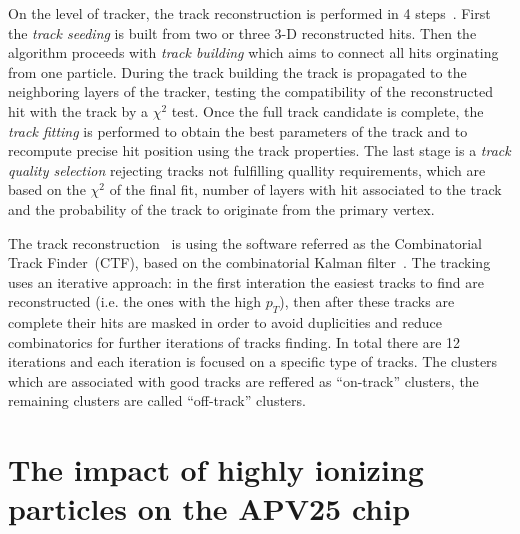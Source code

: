 
On the level of tracker, the track reconstruction is performed in 4 steps~\cite{website:slidesTracking, website:twikiTracking}. First the \textit{track seeding} is built from two or three 3-D reconstructed hits. Then the algorithm proceeds with \textit{track building} which aims to connect all hits orginating from one particle. During the track building the track is propagated to the neighboring layers of the tracker, testing the compatibility of the reconstructed hit with the track by a $\chi^{2}$ test. Once the full track candidate is complete, the \textit{track fitting} is performed to obtain the best parameters of the track and to recompute precise hit position using the track properties. The last stage is a \textit{track quality selection} rejecting tracks not fulfilling quallity requirements, which are based on the $\chi^{2}$ of the final fit, number of layers with hit associated to the track and the probability of the track  to originate from the primary vertex.

The track reconstruction~\cite{Chatrchyan:2014fea} is using the software referred as the Combinatorial Track Finder~(CTF), based on the combinatorial Kalman filter~\cite{Fruhwirth:1987fm}. The tracking uses an iterative approach: in the first interation the easiest tracks to find are reconstructed (i.e. the ones with the high $p_{T}$), then after these tracks are complete their hits are masked in order to avoid duplicities and reduce combinatorics for further iterations of tracks finding. In total there are 12 iterations and each iteration is focused on a specific type of tracks. The clusters which are associated with good tracks are reffered as ``on-track'' clusters, the remaining clusters are called ``off-track'' clusters.


\section{The impact of highly ionizing particles on the APV25 chip}


